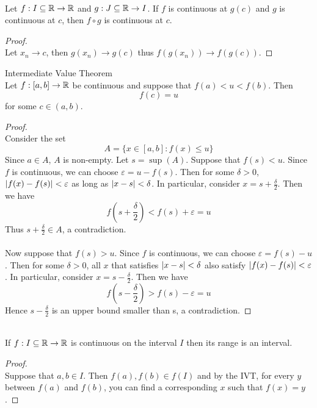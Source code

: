 \documentclass[a4paper]{article}
\begin{document}
\begin{prp}{}{}\\ Let $f:I\subseteq\mathbb{R}\to\mathbb{R}$ and $g:J\subseteq\mathbb{R}\to I$. If $f$ is continuous at $g(c)$ and $g$ is continuous at $c$, then $f\circ g$ is continuous at $c$. 
\begin{proof}\\ Let $x_n\to c$, then $g(x_n)\to g(c)$ thus $f(g(x_n))\to f(g(c))$. 
\end{proof}
\end{prp}

\begin{thm}{Intermediate Value Theorem}{}\\ Let $f:[a,b]\to\mathbb{R}$ be continuous and suppose that $f(a)<u<f(b)$. Then $$f(c)=u$$ for some $c\in(a,b)$.
\begin{proof}\\ Consider the set $$A=\{x\in[a,b]:f(x)\leq u\}$$ Since $a\in A$, $A$ is non-empty. Let $s=\sup(A)$. Suppose that $f(s)<u$. Since $f$ is continuous, we can choose $\varepsilon=u-f(s)$. Then for some $\delta>0$, $\abs{f(x)-f(s)}<\varepsilon$ as long as $\abs{x-s}<\delta$. In particular, consider $x=s+\frac{\delta}{2}$. Then we have $$f\left(s+\frac{\delta}{2}\right)<f(s)+\varepsilon=u$$ Thus $s+\frac{\delta}{2}\in A$, a contradiction. \\~\\
Now suppose that $f(s)>u$. Since $f$ is continuous, we can choose $\varepsilon=f(s)-u$. Then for some $\delta>0$, all $x$ that satisfies $\abs{x-s}<\delta$ also satisfy $\abs{f(x)-f(s)}<\varepsilon$. In particular, consider $x=s-\frac{\delta}{2}$. Then we have $$f\left(s-\frac{\delta}{2}\right)>f(s)-\varepsilon=u$$ Hence $s-\frac{\delta}{2}$ is an upper bound smaller than s, a contradiction. 
\end{proof}
\end{thm}

\begin{prp}{}{}\\ If $f:I\subseteq\mathbb{R}\to\mathbb{R}$ is continuous on the interval $I$ then its range is an interval. 
\begin{proof}\\ Suppose that $a,b\in I$. Then $f(a),f(b)\in f(I)$ and by the IVT, for every $y$ between $f(a)$ and $f(b)$, you can find a corresponding $x$ such that $f(x)=y$. 
\end{proof}
\end{prp}
\end{document}
